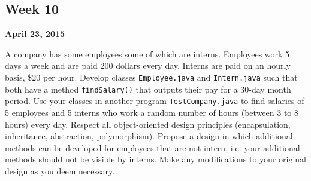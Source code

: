 \documentclass[12pt,letterpaper,twoside]{article}
\begin{document}




\subsection*{Week 10}
\hfill \textbf{April 23, 2015}

A company has some employees some of which are interns. Employees work 5 days a week and are paid 200 dollars every day. Interns are paid on an hourly basis, \$20 per hour. Develop classes \texttt{Employee.java} and \texttt{Intern.java} such that both have a method \texttt{findSalary()} that outputs their pay for a 30-day month period. Use your classes in another program \texttt{TestCompany.java} to find salaries of 5 employees and 5 interns who work a random number of hours (between 3 to 8 hours) every day. Respect all object-oriented design principles (encapsulation, inheritance, abstraction, polymorphism).
Propose a design in which additional methods can be developed for employees that are not intern, i.e. your additional methods should not be visible by interns. Make any modifications to your original design as you deem necessary.
\end{document}
